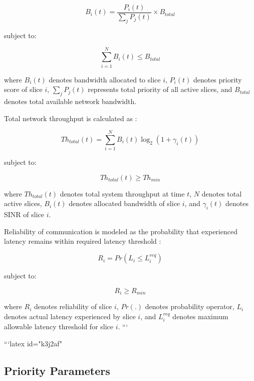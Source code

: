 \documentclass[10pt,journal,compsoc]{IEEEtran}
\begin{document}
\begin{equation}
B_i(t)=\frac{P_i(t)}{\sum_j P_j(t)} \times B_{total}
\end{equation}

subject to:

\begin{equation}
\sum_{i=1}^{N}B_i(t)\leq B_{total}
\end{equation}

where $B_i(t)$ denotes bandwidth allocated to slice $i$, $P_i(t)$ denotes priority score of slice $i$, $\sum_j P_j(t)$ represents total priority of all active slices, and $B_{total}$ denotes total available network bandwidth.

Total network throughput is calculated as \cite{zheng2025eamem}:

\begin{equation}
Th_{total}(t)=\sum_{i=1}^{N} B_i(t)\log_2(1+\gamma_i(t))
\end{equation}

subject to:

\begin{equation}
Th_{total}(t)\geq Th_{min}
\end{equation}

where $Th_{total}(t)$ denotes total system throughput at time $t$, $N$ denotes total active slices, $B_i(t)$ denotes allocated bandwidth of slice $i$, and $\gamma_i(t)$ denotes SINR of slice $i$.

Reliability of communication is modeled as the probability that experienced latency remains within required latency threshold \cite{yaqoob2026aqps}:

\begin{equation}
R_i=Pr(L_i\leq L_i^{req})
\end{equation}

subject to:

\begin{equation}
R_i\geq R_{min}
\end{equation}

where $R_i$ denotes reliability of slice $i$, $Pr(.)$ denotes probability operator, $L_i$ denotes actual latency experienced by slice $i$, and $L_i^{req}$ denotes maximum allowable latency threshold for slice $i$.
```

```latex id="k3j2af"
\subsection{Priority Parameters}
\end{document}
